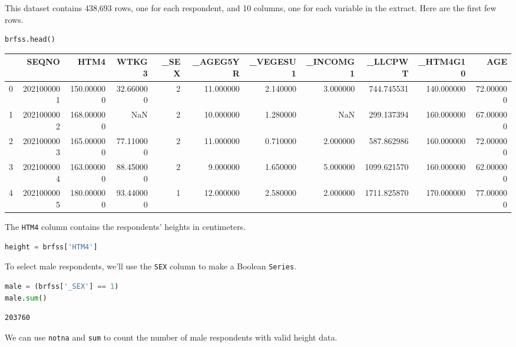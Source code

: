 This dataset contains 438,693 rows, one for each respondent, and 10
columns, one for each variable in the extract. Here are the first few
rows.

\begin{lstlisting}[language=Python,style=source]
brfss.head()
\end{lstlisting}

\begin{tabular}{lrrrrrrrrrr}
\midrule
 & SEQNO & HTM4 & WTKG3 & \_SEX & \_AGEG5YR & \_VEGESU1 & \_INCOMG1 & \_LLCPWT & \_HTM4G10 & AGE \\
\midrule
0 & 2021000001 & 150.000000 & 32.660000 & 2 & 11.000000 & 2.140000 & 3.000000 & 744.745531 & 140.000000 & 72.000000 \\
1 & 2021000002 & 168.000000 & NaN & 2 & 10.000000 & 1.280000 & NaN & 299.137394 & 160.000000 & 67.000000 \\
2 & 2021000003 & 165.000000 & 77.110000 & 2 & 11.000000 & 0.710000 & 2.000000 & 587.862986 & 160.000000 & 72.000000 \\
3 & 2021000004 & 163.000000 & 88.450000 & 2 & 9.000000 & 1.650000 & 5.000000 & 1099.621570 & 160.000000 & 62.000000 \\
4 & 2021000005 & 180.000000 & 93.440000 & 1 & 12.000000 & 2.580000 & 2.000000 & 1711.825870 & 170.000000 & 77.000000 \\
\midrule
\end{tabular}

The \passthrough{\lstinline!HTM4!} column contains the respondents'
heights in centimeters.

\begin{lstlisting}[language=Python,style=source]
height = brfss['HTM4']
\end{lstlisting}

To select male respondents, we'll use the \passthrough{\lstinline!SEX!}
column to make a Boolean \passthrough{\lstinline!Series!}.

\begin{lstlisting}[language=Python,style=source]
male = (brfss['_SEX'] == 1)
male.sum()
\end{lstlisting}

\begin{lstlisting}[style=output]
203760
\end{lstlisting}

We can use \passthrough{\lstinline!notna!} and
\passthrough{\lstinline!sum!} to count the number of male respondents
with valid height data.

